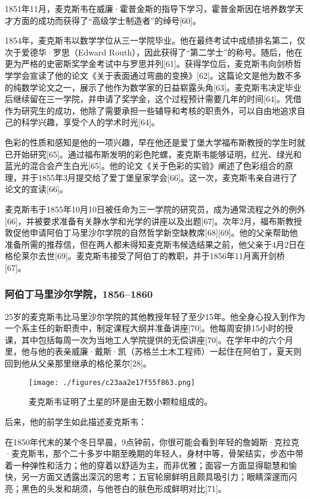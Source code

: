 1851年11月，麦克斯韦在威廉·霍普金斯的指导下学习，霍普金斯因在培养数学天才方面的成功而获得了“高级学士制造者”的绰号[60]。

1854年，麦克斯韦以数学学位从三一学院毕业。他在最终考试中成绩排名第二，仅次于爱德华·罗思（Edward Routh），因此获得了“第二学士”的称号。随后，他在更为严格的史密斯奖学金考试中与罗思并列[61]。获得学位后，麦克斯韦向剑桥哲学学会宣读了他的论文《关于表面通过弯曲的变换》[62]。这篇论文是他为数不多的纯数学论文之一，展示了他作为数学家的日益崭露头角[63]。麦克斯韦决定毕业后继续留在三一学院，并申请了奖学金，这个过程预计需要几年的时间[64]。凭借作为研究生的成功，他除了需要承担一些辅导和考核的职责外，可以自由地追求自己的科学兴趣，享受个人的学术时光[64]。

色彩的性质和感知是他的一项兴趣，早在他还是爱丁堡大学福布斯教授的学生时就已开始研究[65]。通过福布斯发明的彩色陀螺，麦克斯韦能够证明，红光、绿光和蓝光的混合会产生白光[65]。他的论文《关于色彩的实验》阐述了色彩组合的原理，并于1855年3月提交给了爱丁堡皇家学会[66]。这一次，麦克斯韦亲自进行了论文的宣读[66]。

麦克斯韦于1855年10月10日被任命为三一学院的研究员，成为通常流程之外的例外[66]，并被要求准备有关静水学和光学的讲座以及出题[67]。次年2月，福布斯教授敦促他申请阿伯丁马里沙尔学院的自然哲学新空缺教席[68][69]。他的父亲帮助他准备所需的推荐信，但在两人都未得知麦克斯韦候选结果之前，他父亲于4月2日在格伦莱尔去世[69]。麦克斯韦接受了阿伯丁的教职，并于1856年11月离开剑桥[67]。
\subsubsection{阿伯丁马里沙尔学院，1856–1860}
25岁的麦克斯韦比马里沙尔学院的其他教授年轻了至少15年。他全身心投入到作为一个系主任的新职责中，制定课程大纲并准备讲座[70]。他每周安排15小时的授课，其中包括每周一次为当地工人学院提供的无偿讲座[70]。在学年中的六个月里，他与他的表亲威廉·戴斯·凯（苏格兰土木工程师）一起住在阿伯丁，夏天则回到他从父亲那里继承的格伦莱尔[28]。
\begin{figure}[ht]
\centering
\texttt{[image: ./figures/c23aa2e17f55f863.png]}
\caption{麦克斯韦证明了土星的环是由无数小颗粒组成的。} \label{fig_Clerk_3}
\end{figure}
后来，他的前学生如此描述麦克斯韦：

在1850年代末的某个冬日早晨，9点钟前，你很可能会看到年轻的詹姆斯·克拉克·麦克斯韦，那个二十多岁中期至晚期的年轻人，身材中等，骨架结实，步态中带着一种弹性和活力；他的穿着以舒适为主，而非优雅；面容一方面显得聪慧和愉快，另一方面又透露出深沉的思考；五官轮廓鲜明且颇具吸引力；眼睛深邃而闪亮；黑色的头发和胡须，与他苍白的肤色形成鲜明对比[71]。

